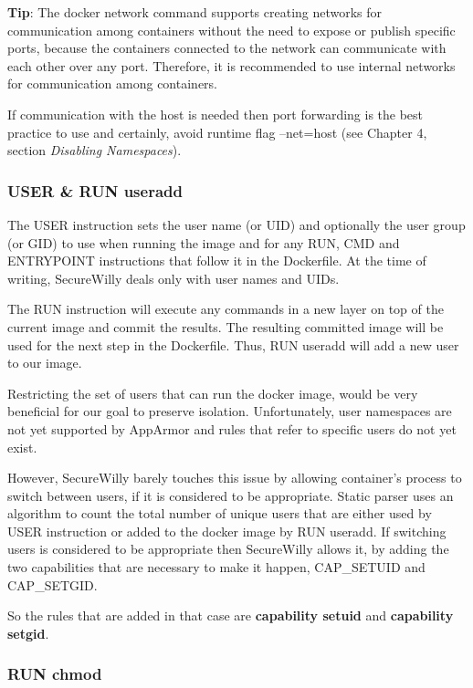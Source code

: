 \begin{mdframed}[backgroundcolor=tipcolor]
\textbf{Tip}: The docker network command supports creating networks for communication among containers without the need to expose or publish specific ports, because the containers connected to the network can communicate with each other over any port. Therefore, it is recommended to use internal networks for communication among containers.

If communication with the host is needed then port forwarding is the best practice to use and certainly, avoid runtime flag --net=host (see Chapter 4, section \textit{Disabling Namespaces}).
\end{mdframed}

\subsubsection{USER \& RUN useradd}
The USER instruction sets the user name (or UID) and optionally the user group (or GID) to use when running the image and for any RUN, CMD and ENTRYPOINT instructions that follow it in the Dockerfile. At the time of writing, SecureWilly deals only with user names and UIDs.

The RUN instruction will execute any commands in a new layer on top of the current image and commit the results. The resulting committed image will be used for the next step in the Dockerfile. Thus, RUN useradd will add a new user to our image.

Restricting the set of users that can run the docker image, would be very beneficial for our goal to preserve isolation. Unfortunately, user namespaces are not yet supported by AppArmor and rules that refer to specific users do not yet exist.
  
However, SecureWilly barely touches this issue by allowing container's process to switch between users, if it is considered to be appropriate. Static parser uses an algorithm to count the total number of unique users that are either used by USER instruction or added to the docker image by RUN useradd. If switching users is considered to be appropriate then SecureWilly allows it, by adding the two capabilities that are necessary to make it happen, CAP\_SETUID and CAP\_SETGID.

So the rules that are added in that case are \textbf{capability setuid} and \textbf{capability setgid}.
\subsubsection{RUN chmod}

